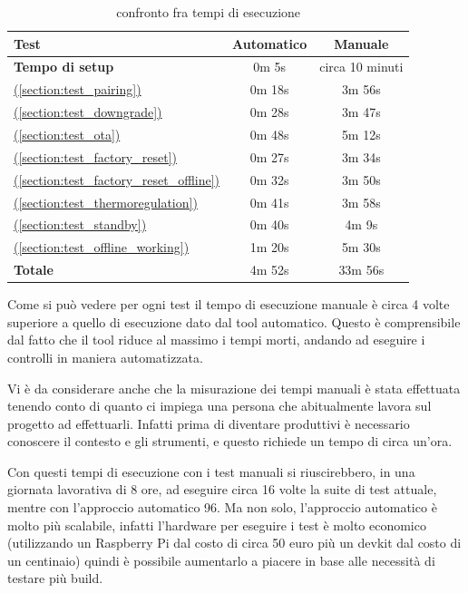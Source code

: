 \documentclass[12pt,a4paper,twoside,titlepage]{book}
\newcommand*{\fullref}[1]{\hyperref[{#1}]{\nameref*{#1} (\ref*{#1})}}
\begin{document}
\begin{table}
    \centering
    \begin{tabular}{| l | c | c |}
        \hline
        \textbf{Test} & \textbf{Automatico} & \textbf{Manuale} \\ \hline
        \textbf{Tempo di setup} & 0m 5s & circa 10 minuti \\\hline
        \fullref{section:test_pairing} & 0m 18s & 3m 56s \\ \hline
        \fullref{section:test_downgrade} & 0m 28s & 3m 47s \\ \hline
        \fullref{section:test_ota} & 0m 48s & 5m 12s \\ \hline
        \fullref{section:test_factory_reset} & 0m 27s & 3m 34s \\ \hline
        \fullref{section:test_factory_reset_offline} & 0m 32s & 3m 50s \\ \hline 
        \fullref{section:test_thermoregulation} & 0m 41s & 3m 58s \\ \hline 
        \fullref{section:test_standby} & 0m 40s & 4m 9s \\ \hline 
        \fullref{section:test_offline_working} & 1m 20s & 5m 30s \\ \hline 
        \textbf{Totale} & 4m 52s & 33m 56s \\ \hline
    \end{tabular}
    \caption{confronto fra tempi di esecuzione}
    \label{table:time_compare}
\end{table}

Come si può vedere per ogni test il tempo di esecuzione manuale è circa 4 volte superiore a quello di esecuzione 
dato dal tool automatico. Questo è comprensibile dal fatto che il tool riduce al massimo i tempi morti, andando ad 
eseguire i controlli in maniera automatizzata. 

Vi è da considerare anche che la misurazione dei tempi manuali è stata effettuata tenendo conto di 
quanto ci impiega una persona che abitualmente lavora sul progetto ad effettuarli. Infatti prima di diventare 
produttivi è necessario conoscere il contesto e gli strumenti, e questo richiede un tempo di circa un'ora. 

Con questi tempi di esecuzione con i test manuali si riuscirebbero, in una giornata lavorativa di 8 ore, ad eseguire 
circa 16 volte la suite di test attuale, mentre con l'approccio automatico 96. Ma non solo, l'approccio automatico 
è molto più scalabile, infatti l'hardware per eseguire i test è molto economico (utilizzando un Raspberry Pi dal costo 
di circa 50 euro più un devkit dal costo di un centinaio) quindi è possibile aumentarlo a piacere in base alle necessità 
di testare più build. 
\end{document}
